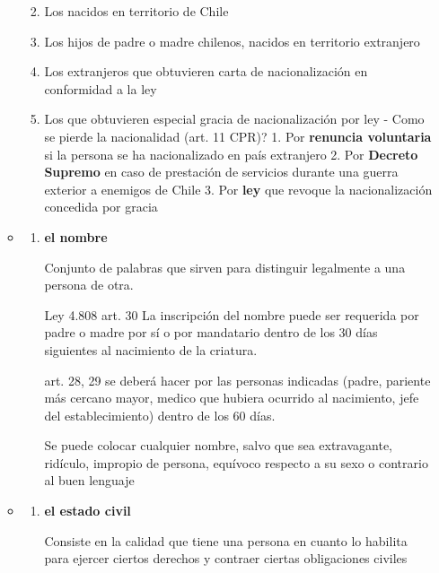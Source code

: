 \documentclass[]{article}
\providecommand{\tightlist}{%
  \setlength{\itemsep}{0pt}\setlength{\parskip}{0pt}}
\begin{document}
\begin{itemize}
\begin{itemize}
    \begin{enumerate}
    \def\labelenumi{\arabic{enumi}.}
    \tightlist
    \item
      Los nacidos en territorio de Chile
    \item
      Los hijos de padre o madre chilenos, nacidos en territorio
      extranjero
    \item
      Los extranjeros que obtuvieren carta de nacionalización en
      conformidad a la ley
    \item
      Los que obtuvieren especial gracia de nacionalización por ley -
      Como se pierde la nacionalidad (art. 11 CPR)? 1. Por
      \textbf{renuncia voluntaria} si la persona se ha nacionalizado en
      país extranjero 2. Por \textbf{Decreto Supremo} en caso de
      prestación de servicios durante una guerra exterior a enemigos de
      Chile 3. Por \textbf{ley} que revoque la nacionalización concedida
      por gracia
    \end{enumerate}
  \item
    \begin{enumerate}
    \def\labelenumi{\alph{enumi})}
    \setcounter{enumi}{1}
    \item
      \textbf{el nombre}

      Conjunto de palabras que sirven para distinguir legalmente a una
      persona de otra.

      Ley 4.808 art. 30 La inscripción del nombre puede ser requerida
      por padre o madre por sí o por mandatario dentro de los 30 días
      siguientes al nacimiento de la criatura.

      art. 28, 29 se deberá hacer por las personas indicadas (padre,
      pariente más cercano mayor, medico que hubiera ocurrido al
      nacimiento, jefe del establecimiento) dentro de los 60 días.

      Se puede colocar cualquier nombre, salvo que sea extravagante,
      ridículo, impropio de persona, equívoco respecto a su sexo o
      contrario al buen lenguaje
    \end{enumerate}
  \item
    \begin{enumerate}
    \def\labelenumi{\alph{enumi})}
    \setcounter{enumi}{2}
    \item
      \textbf{el estado civil}

      Consiste en la calidad que tiene una persona en cuanto lo habilita
      para ejercer ciertos derechos y contraer ciertas obligaciones
      civiles


\end{enumerate}
\end{itemize}
\end{itemize}
\end{document}
